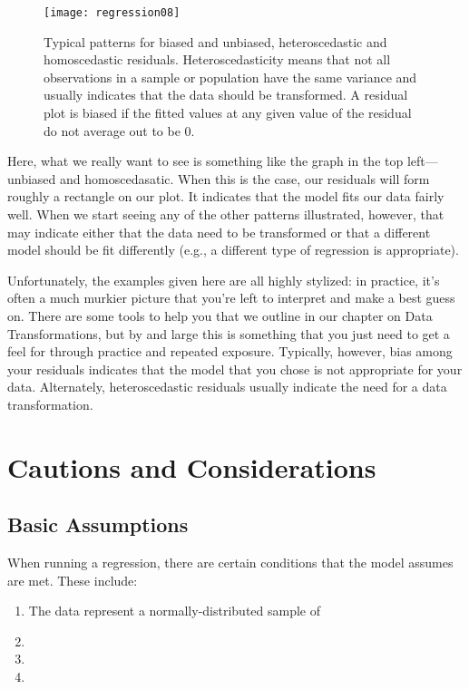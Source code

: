 \begin{figure}[h]
\texttt{[image: regression08]}
\label{fig:regression08}
\caption{Typical patterns for biased and unbiased, heteroscedastic and homoscedastic residuals. Heteroscedasticity means that not all observations in a sample or population have the same variance and usually indicates that the data should be transformed. A residual plot is biased if the fitted values at any given value of the residual do not average out to be 0.}
\end{figure}

Here, what we really want to see is something like the graph in the top left---unbiased and homoscedasatic. When this is the case, our residuals will form roughly a rectangle on our plot. It indicates that the model fits our data fairly well. When we start seeing any of the other patterns illustrated, however, that may indicate either that the data need to be transformed or that a different model should be fit differently (e.g., a different type of regression is appropriate).

Unfortunately, the examples given here are all highly stylized: in practice, it's often a much murkier picture that you're left to interpret and make a best guess on. There are some tools to help you that we outline in our chapter on Data Transformations, but by and large this is something that you just need to get a feel for through practice and repeated exposure. Typically, however, bias among your residuals indicates that the model that you chose is not appropriate for your data. Alternately, heteroscedastic residuals usually indicate the need for a data transformation.

\section{Cautions and Considerations}

\subsection{Basic Assumptions}

When running a regression, there are certain conditions that the model assumes are met. These include:
\begin{enumerate}
	\item The data represent a normally-distributed sample of 
	\item 
	\item 
	\item 
\end{enumerate}

